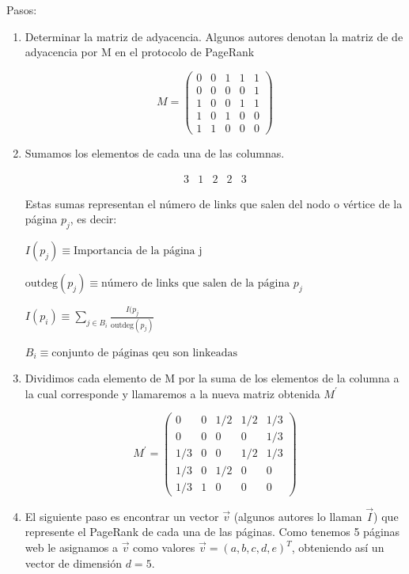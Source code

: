Pasos:
\begin{enumerate}
\item Determinar la matriz de adyacencia. Algunos autores denotan la matriz de de adyacencia por M en el protocolo de PageRank

\[
M = \begin{pmatrix}
0 & 0 & 1 & 1 & 1 \\
0 & 0 & 0 & 0 & 1 \\
1 & 0 & 0 & 1 & 1 \\
1 & 0 & 1 & 0 & 0 \\
1 & 1 & 0 & 0 & 0
\end{pmatrix}
\]

\item Sumamos los elementos de cada una de las columnas.

\[
\begin{matrix}
3 & 1 & 2 & 2 & 3
\end{matrix}
\]

Estas sumas representan el número de links que salen del nodo o vértice de la página $p_j$, es decir: 

$I(p_j) \equiv \text{Importancia de la página j}$

$\mathrm{outdeg}(p_j) \equiv \text{número de links que salen de la página } p_j$

$I(p_i) \equiv \sum\limits_{j \in B_i} \frac{I(p_j}{\mathrm{outdeg}(p_j)}$

$B_i \equiv \text{conjunto de páginas qeu son linkeadas}$

\item Dividimos cada elemento de M por la suma de los elementos de la columna a la cual corresponde y llamaremos a la nueva matriz obtenida $M^\prime$

\[
M^\prime = \begin{pmatrix}
0 & 0 & 1/2 & 1/2 & 1/3 \\
0 & 0 & 0 & 0 & 1/3 \\
1/3 & 0 & 0 & 1/2 & 1/3 \\
1/3 & 0 & 1/2 & 0 & 0 \\
1/3 & 1 & 0 & 0 & 0
\end{pmatrix}
\]

\item El siguiente paso es encontrar un vector $\vec{v}$ (algunos autores lo llaman $\vec{I}$) que represente el PageRank de cada una de las páginas. Como tenemos 5 páginas web le asignamos a $\vec{v}$ como valores $\vec{v} = (a,b,c,d,e)^T$, obteniendo así un vector de dimensión $d=5$.


\end{enumerate}
